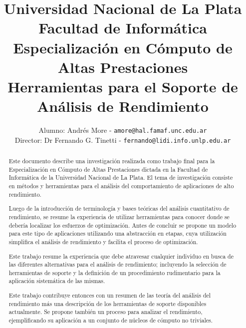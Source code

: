 \documentclass[a4paper]{report}
\begin{document}
\title{Universidad Nacional de La Plata\\Facultad de Inform\'atica\\ \bigskip
  Especializaci\'on en C\'omputo de Altas Prestaciones\\ \bigskip
  Herramientas para el Soporte de An\'alisis de Rendimiento}

\author{
  Alumno: Andr\'es More - {\tt amore@hal.famaf.unc.edu.ar}\\
  Director: Dr Fernando G. Tinetti - {\tt fernando@lidi.info.unlp.edu.ar}
}


\maketitle

\begin{abstract}

  Este documento describe una investigaci\'on realizada como trabajo final para
  la Especializaci\'on en C\'omputo de Altas Prestaciones dictada en la
  Facultad de Inform\'atica de la Universidad Nacional de La Plata.
  El tema de investigaci\'on consiste en m\'etodos y herramientas para
  el an\'alisis del comportamiento de aplicaciones de alto rendimiento.

  \bigskip

  Luego de la introducci\'on de terminolog\'ia y bases te\'oricas del
  an\'alisis cuantitativo de rendimiento, se resume la experiencia de utilizar
  herramientas para conocer donde se deber\'ia localizar los esfuerzos de
  optimizaci\'on. Antes de concluir se propone un modelo para este tipo de
  aplicaciones utilizando una abstracci\'on en etapas, cuya
  utilizaci\'on simplifica el an\'alisis de rendimiento y facilita el proceso de optimizaci\'on.

  \bigskip

  Este trabajo resume la experiencia que debe atravesar cualquier
  individuo en busca de las diferentes alternativas para el an\'alisis de
  rendimiento; incluyendo la selecci\'on de herramientas de soporte y la
  definici\'on de un procedimiento rudimentario para la aplicaci\'on sistem\'atica
  de las mismas.

  \bigskip

  Este trabajo contribuye entonces con un resumen de las teor\'ia del an\'alisis del
  rendimiento m\'as una descripci\'on de los herramientas de soporte 
  disponibles actualmente. Se propone tambi\'en un proceso para analizar el
  rendimiento, ejemplificando su aplicaci\'on a un conjunto de n\'ucleos de
  c\'omputo no triviales.

\end{abstract}
\end{document}
